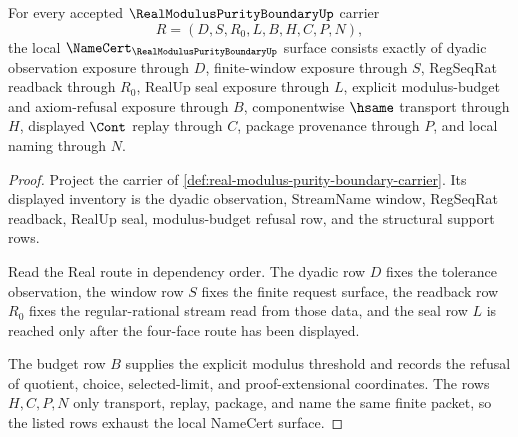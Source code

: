 \begin{theorem}
\label{thm:real-modulus-purity-boundary-namecert-obligations}
For every accepted $\RealModulusPurityBoundaryUp$ carrier
$$
R=(D,S,R_0,L,B,H,C,P,N),
$$
the local $\NameCert_{\RealModulusPurityBoundaryUp}$ surface consists exactly of dyadic observation exposure through $D$, finite-window exposure through $S$, RegSeqRat readback through $R_0$, RealUp seal exposure through $L$, explicit modulus-budget and axiom-refusal exposure through $B$, componentwise $\hsame$ transport through $H$, displayed $\Cont$ replay through $C$, package provenance through $P$, and local naming through $N$.
\end{theorem}
\begin{proof}
Project the carrier of \autoref{def:real-modulus-purity-boundary-carrier}. Its displayed inventory is the dyadic observation, StreamName window, RegSeqRat readback, RealUp seal, modulus-budget refusal row, and the structural support rows.

Read the Real route in dependency order. The dyadic row $D$ fixes the tolerance observation, the window row $S$ fixes the finite request surface, the readback row $R_0$ fixes the regular-rational stream read from those data, and the seal row $L$ is reached only after the four-face route has been displayed.

The budget row $B$ supplies the explicit modulus threshold and records the refusal of quotient, choice, selected-limit, and proof-extensional coordinates. The rows $H,C,P,N$ only transport, replay, package, and name the same finite packet, so the listed rows exhaust the local NameCert surface.
\end{proof}

